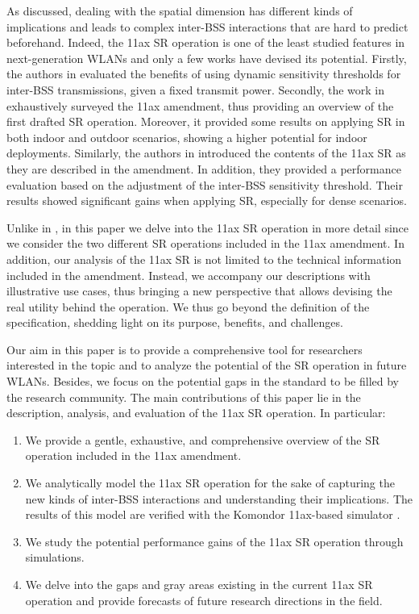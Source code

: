 \documentclass{ieeeaccess}
\begin{document}
As discussed, dealing with the spatial dimension has different kinds of implications and leads to complex inter-BSS interactions that are hard to predict beforehand. Indeed, the 11ax SR operation is one of the least studied features in next-generation WLANs and only a few works have devised its potential. Firstly, the authors in \cite{mori2014performance} evaluated the benefits of using dynamic sensitivity thresholds for inter-BSS transmissions, given a fixed transmit power. Secondly, the work in \cite{qu2018survey} exhaustively surveyed the 11ax amendment, thus providing an overview of the first drafted SR operation. Moreover, it provided some results on applying SR in both indoor and outdoor scenarios, showing a higher potential for indoor deployments. Similarly, the authors in \cite{shen2018research} introduced the contents of the 11ax SR as they are described in the amendment. In addition, they provided a performance evaluation based on the adjustment of the inter-BSS sensitivity threshold. Their results showed significant gains when applying SR, especially for dense scenarios. 

Unlike in \cite{mori2014performance, qu2018survey, shen2018research}, in this paper we delve into the 11ax SR operation in more detail since we consider the two different SR operations included in the 11ax amendment. In addition, our analysis of the 11ax SR is not limited to the technical information included in the amendment. Instead, we accompany our descriptions with illustrative use cases, thus bringing a new perspective that allows devising the real utility behind the operation. We thus go beyond the definition of the specification, shedding light on its purpose, benefits, and challenges.

Our aim in this paper is to provide a comprehensive tool for researchers interested in the topic and to analyze the potential of the SR operation in future WLANs. Besides, we focus on the potential gaps in the standard to be filled by the research community. The main contributions of this paper lie in the description, analysis, and evaluation of the 11ax SR operation. In particular:
\begin{enumerate}
	\item We provide a gentle, exhaustive, and comprehensive overview of the SR operation included in the 11ax amendment.
	\item We analytically model the 11ax SR operation for the sake of capturing the new kinds of inter-BSS interactions and understanding their implications. The results of this model are verified with the Komondor 11ax-based simulator \cite{barrachina2019komondor}.
	\item We study the potential performance gains of the 11ax SR operation through simulations. 
	\item We delve into the gaps and gray areas existing in the current 11ax SR operation and provide forecasts of future research directions in the field.
\end{enumerate}
\end{document}
